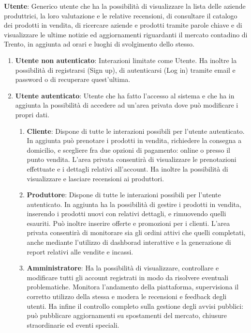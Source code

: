 \begin{attori}
    \item \textbf{Utente}: Generico utente che ha la possibilità di visualizzare la lista delle aziende produttrici, la loro valutazione e le relative recensioni, di consultare il catalogo dei prodotti in vendita, di ricercare aziende e prodotti tramite parole chiave e di visualizzare le ultime notizie ed aggiornamenti riguardanti il mercato contadino di Trento, in aggiunta ad orari e luoghi di svolgimento dello stesso.
    \begin{enumerate}
        \item \textbf{Utente non autenticato}: Interazioni limitate come Utente. Ha inoltre la possibilità di registrarsi (Sign up), di autenticarsi (Log in) tramite email e password o di recuperare quest'ultima.
        
        \item \textbf{Utente autenticato}: Utente che ha fatto l'accesso al sistema e che ha in aggiunta la possibilità di accedere ad un'area privata dove può modificare i propri dati.
    
        \begin{enumerate}
            \item \textbf{Cliente}: Dispone di tutte le interazioni possibili per l'utente autenticato. In aggiunta può prenotare i prodotti in vendita, richiedere la consegna a domicilio, e scegliere fra due opzioni di pagamento: online o presso il punto vendita. L'area privata consentirà di visualizzare le prenotazioni effettuate e i dettagli relativi all'account. Ha inoltre la possibilità di visualizzare e lasciare recensioni ai produttori. 
            
            \item \textbf{Produttore}: Dispone di tutte le interazioni possibili per l'utente autenticato. In aggiunta ha la possibilità di gestire i prodotti in vendita, inserendo i prodotti nuovi con relativi dettagli, e rimuovendo quelli esauriti. Può inoltre inserire offerte e promozioni per i clienti. L'area privata consentirà di monitorare sia gli ordini attivi che quelli completati, anche mediante l'utilizzo di dashborad interattive e la generazione di report relativi alle vendite e incassi.
            
             \item \textbf{Amministratore}: Ha la possibilità di visualizzare, controllare e modificare tutti gli account registrati in modo da risolvere eventuali problematiche. Monitora l’andamento della piattaforma, supervisiona il corretto utilizzo della stessa e modera le recensioni e feedback degli utenti.
             Ha infine il controllo completo sulla gestione degli avvisi pubblici: può pubblicare aggiornamenti su spostamenti del mercato, chiusure straordinarie ed eventi speciali.


\end{enumerate}
\end{enumerate}
\end{attori}
